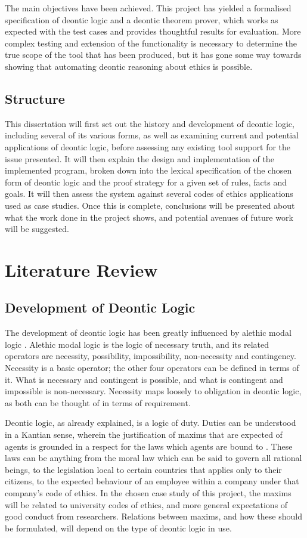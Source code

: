 \documentclass{l4proj}
\begin{document}
The main objectives have been achieved. This project has yielded a formalised specification of deontic logic and a deontic theorem prover, which works as expected with the test cases and provides thoughtful results for evaluation. More complex testing and extension of the functionality is necessary to determine the true scope of the tool that has been produced, 
but it has gone some way towards showing that automating deontic reasoning about ethics is possible. 

\section{Structure}
This dissertation will first set out the history and development of deontic logic, including several of its various forms, as well as examining current and potential applications of deontic logic, before assessing any existing tool support for the issue presented. It will then explain the design and implementation of the implemented program, broken down into the lexical specification of the chosen form of deontic logic and the proof strategy for a given set of rules, facts and goals. It will then assess the system against several codes of ethics applications used as case studies. Once this is complete, conclusions will be presented about what the work done in the project shows, and potential avenues of future work will be suggested. 

\chapter{Literature Review}

\section{Development of Deontic Logic}%
The development of deontic logic has been greatly influenced by alethic modal logic \cite{sep-logic-deontic}. Alethic modal logic is the logic of necessary truth, and its related operators are necessity, possibility, impossibility, non-necessity and contingency. Necessity is a basic operator; the other four operators can be defined in terms of it. What is necessary and contingent is possible, and what is contingent and impossible is non-necessary. Necessity maps loosely to obligation in deontic logic, as both can be thought of in terms of requirement. 

Deontic logic, as already explained, is a logic of duty. Duties can be understood in a Kantian sense, wherein the justification of maxims that are expected of agents is grounded in a respect for the laws which agents are bound to \cite{sep-kant-moral}. These laws can be anything from the moral law which can be said to govern all rational beings, to the legislation local to certain countries that applies only to their citizens, to the expected behaviour of an employee within a company under that company's code of ethics. In the chosen case study of this project, the maxims will be related to university codes of ethics, and more general expectations of good conduct from researchers. Relations between maxims, and how these should be formulated, will depend on the type of deontic logic in use. 
\end{document}
